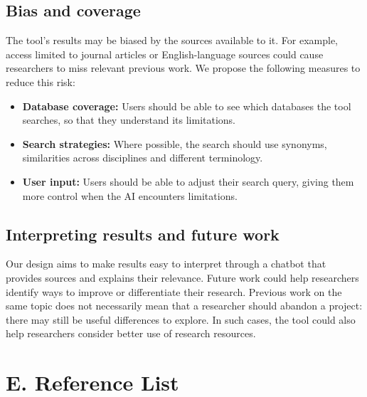 \documentclass[11pt,a4paper]{article}
\begin{document}
\subsection*{Bias and coverage}
The tool's results may be biased by the sources available to it. For example, access limited to journal articles or English-language sources could cause researchers to miss relevant previous work. We propose the following measures to reduce this risk:
\begin{itemize}[leftmargin=*]
    \item \textbf{Database coverage:} Users should be able to see which databases the tool searches, so that they understand its limitations.
    \item \textbf{Search strategies:} Where possible, the search should use synonyms, similarities across disciplines and different terminology.
    \item \textbf{User input:} Users should be able to adjust their search query, giving them more control when the AI encounters limitations.
\end{itemize}

\subsection*{Interpreting results and future work}
Our design aims to make results easy to interpret through a chatbot that provides sources and explains their relevance. Future work could help researchers identify ways to improve or differentiate their research. Previous work on the same topic does not necessarily mean that a researcher should abandon a project: there may still be useful differences to explore. In such cases, the tool could also help researchers consider better use of research resources.


\clearpage
\section*{E. Reference List}
\end{document}
